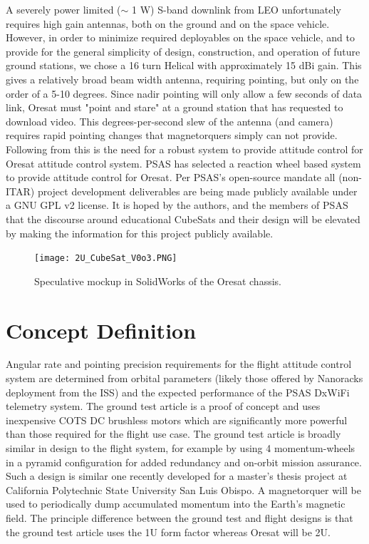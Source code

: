 \documentclass[]{aiaa-tc}%
\begin{document}
A severely power limited ($\sim$ 1 W) S-band downlink from LEO unfortunately requires high gain antennas, both on the ground and on the space vehicle. However, in order to minimize required deployables on the space vehicle, and to provide for the general simplicity of design, construction, and operation of future ground stations, we chose a 16 turn Helical with approximately 15 dBi gain. This gives a relatively broad beam width antenna, requiring pointing, but only on the order of a 5-10 degrees. Since nadir pointing will only allow a few seconds of data link, Oresat must "point and stare" at a ground station that has requested to download video. This degrees-per-second slew of the antenna (and camera) requires rapid pointing changes that magnetorquers simply can not provide. Following from this is the need for a robust system to provide attitude control for Oresat attitude control system. PSAS has selected a reaction wheel based system to provide attitude control for Oresat. Per PSAS’s open-source mandate all (non-ITAR) project development deliverables are being made publicly available under a GNU GPL v2 license\cite{Oresat:15bk}. It is hoped by the authors, and the members of PSAS that the discourse around educational CubeSats and their design will be elevated by making the information for this project publicly available.

\begin{figure}[h!]
  \centering
  \texttt{[image: 2U\_CubeSat\_V0o3.PNG]}
  \caption{Speculative mockup in SolidWorks of the Oresat chassis.}
  \label{fig:oresat}
\end{figure}

\section{Concept Definition}
	Angular rate and pointing precision requirements for the flight attitude control system are determined from orbital parameters (likely those offered by Nanoracks deployment from the ISS) and the expected performance of the PSAS DxWiFi telemetry system. The ground test article is a proof of concept and uses inexpensive COTS DC brushless motors which are significantly more powerful than those required for the flight use case. The ground test article is broadly similar in design to the flight system, for example by using 4 momentum-wheels in a pyramid configuration for added redundancy and on-orbit mission assurance. Such a design is similar one recently developed for a master's thesis project at California Polytechnic State University San Luis Obispo\cite{Logan:08bk}. A magnetorquer will be used to periodically dump accumulated momentum into the Earth's magnetic field. The principle difference between the ground test and flight designs is that the ground test article uses the 1U form factor whereas Oresat will be 2U.
\end{document}
